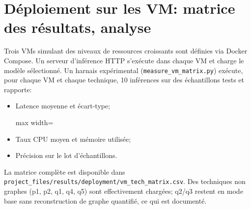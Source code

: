 \documentclass[11pt,a4paper]{article}
\begin{document}
\section{Déploiement sur les VM: matrice des résultats, analyse}
Trois VMs simulant des niveaux de ressources croissants sont définies via Docker Compose. Un serveur d'inférence HTTP s'exécute dans chaque VM et charge le modèle sélectionné. Un harnais expérimental (\texttt{measure\_vm\_matrix.py}) exécute, pour chaque VM et chaque technique, 10 inférences sur des échantillons tests et rapporte:
\begin{itemize}
  \item Latence moyenne et écart-type;
\begin{table}[h]
\centering
\caption{Matrice VM$\times$Technique (résumé)}
\begin{adjustbox}{max width=\textwidth}
\end{adjustbox}
\end{table}

  \item Taux CPU moyen et mémoire utilisée;
  \item Précision sur le lot d'échantillons.
\end{itemize}
La matrice complète est disponible dans \texttt{project\_files/results/deployment/vm\_tech\_matrix.csv}. Des techniques non graphes (p1, p2, q1, q4, q5) sont effectivement chargées; q2/q3 restent en mode base sans reconstruction de graphe quantifié, ce qui est documenté.
\end{document}
